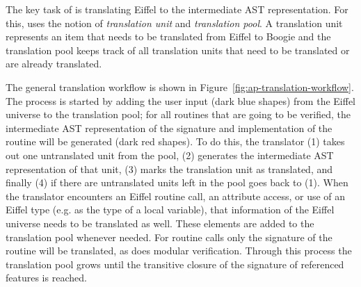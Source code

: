 The key task of \AutoProof is translating Eiffel to the intermediate AST representation. For this, \AutoProof uses the notion of \emph{translation unit} and \emph{translation pool}. A translation unit represents an item that needs to be translated from Eiffel to Boogie and the translation pool keeps track of all translation units that need to be translated or are already translated.

The general translation workflow is shown in Figure~\ref{fig:ap-translation-workflow}. The process is started by adding the user input (dark blue shapes) from the Eiffel universe to the translation pool; for all routines that are going to be verified, the intermediate AST representation of the signature and implementation of the routine will be generated (dark red shapes). To do this, the translator (1) takes out one untranslated unit from the pool, (2) generates the intermediate AST representation of that unit, (3) marks the translation unit as translated, and finally (4) if there are untranslated units left in the pool goes back to (1). When the translator encounters an Eiffel routine call, an attribute access, or use of an Eiffel type (e.g. as the type of a local variable), that information of the Eiffel universe needs to be translated as well. These elements are added to the translation pool whenever needed. For routine calls only the signature of the routine will be translated, as \AutoProof does modular verification. Through this process the translation pool grows until the transitive closure of the signature of referenced features is reached.

